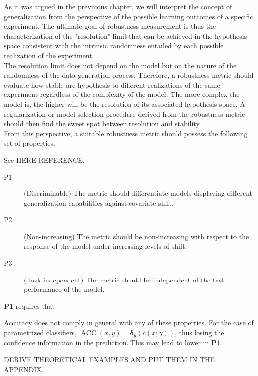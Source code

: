 As it was argued in the previuous chapter, we will 
interpret the concept of generalization from the 
perspective of the possible learning outcomes
of a specific experiment. The ultimate goal 
of robustness measurement is thus the characterization of the "resolution" 
limit that can be achieved in the hypothesis space 
consistent with the intrinsic randomness entailed by each 
possible realization of the experiment.\\

The resolution limit does not depend on the model but on the 
nature of the randomness of the data generation process. 
Therefore, a robustness metric should evaluate how stable are hypothesis 
to different realizations of the same experiment regardless 
of the complexity of the model. The more 
complex the model is, the higher will be the resolution of its
associated hypothesis space. A regularization or model selection 
procedure derived from the robustness metric should then
find the sweet spot between resolution and stability. \\

From this perspective, a suitable robustness metric should possess
the following set of properties.

\begin{properties}\label{properties:robustness}
    See HERE REFERENCE.
\begin{description}
    \item[P1](Discriminable) The metric should differentiate models displaying
    different generalization capabilities against covariate shift.
    \item[P2](Non-increasing) The metric should be non-increasing with respect to the
    response of the model under increasing levels of shift.
    \item[P3](Task-independent) The metric should be independent of the task
    performance of the model.
\end{description}
\end{properties}

\textbf{P1} requires that 




Accuracy does not comply in general with any of these properties. For the case
of parametrized classifiers, $\operatorname{ACC}(x, y) = \bm{\delta}_{y}(c(x; \gamma))$,
thus losing the confidence information in the prediction. This may lead to lower in \textbf{P1}


DERIVE THEORETICAL EXAMPLES AND PUT THEM IN THE APPENDIX.

